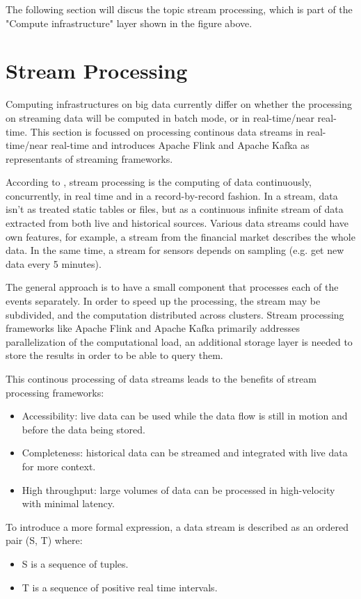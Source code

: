 The following section will discus the topic stream processing, which is part of the
"Compute infrastructure" layer shown in the figure above.

\section{Stream Processing}

Computing infrastructures on big data currently differ on whether the processing on streaming data
will be computed in batch mode, or in real-time/near real-time. This section is focussed on processing
continous data streams in real-time/near real-time and introduces Apache Flink and Apache Kafka as
representants of streaming frameworks.

According to \cite{Klepp16}, stream processing is the computing of data continuously,
concurrently, in real time and in a record-by-record fashion. In a stream, data isn't as treated static tables
or files, but as a continuous infinite stream of data extracted from both live and historical
sources. Various data streams could have own features, for example, a stream
from the financial market describes the whole data. In the same time, a stream for sensors
depends on sampling (e.g. get new data every 5 minutes).

The general approach is to have a small component that processes each of the events
separately. In order to speed up the processing, the stream may be subdivided, and the
computation distributed across clusters. Stream processing frameworks like Apache Flink and
Apache Kafka primarily addresses parallelization of the computational load, an additional storage
layer is needed to store the results in order to be able to query them.

This continous processing of data streams leads to the benefits of stream processing frameworks:

\begin{itemize}
	\item Accessibility: live data can be used while the data flow is still in motion and before the data being stored.
	\item Completeness: historical data can be streamed and integrated with live data for more context.
	\item High throughput: large volumes of data can be processed in high-velocity with minimal latency.
\end{itemize}

To introduce a more formal expression, a data stream is described as an ordered pair (S, T) where:
\begin{itemize}
	\item S is a sequence of tuples.
	\item T is a sequence of positive real time intervals.
\end{itemize}

